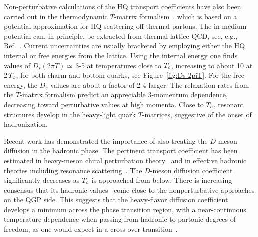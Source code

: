  Non-perturbative calculations of the HQ transport coefficients have also been carried out 
 in the thermodynamic $T$-matrix formalism~\cite{vanHees:2007me,Riek:2010fk,Huggins:2012dj}, 
 which is based on a potential approximation for HQ scattering off thermal partons. The 
 in-medium potential can, in principle, be extracted from thermal lattice QCD, see, e.g., 
 Ref.~\cite{Burnier:2014ssa}. Current uncertainties are usually bracketed by employing 
 either the HQ internal or free energies from the lattice. Using the internal energy one 
 finds values of $D_s(2\pi T)\simeq$\,3-5 at temperatures close to $T_{\rm c}$, increasing 
 to about 10 at 2\,$T_{\rm c}$, for both charm and bottom quarks, see Figure~\ref{fig:Ds-2piT}. 
 For the free energy, the $D_s$ values are about a factor of 2-4 larger. The relaxation 
 rates from the $T$-matrix formalism predict an appreciable 3-momentum dependence, decreasing 
 toward perturbative values at high momenta. Close to $T_{\rm c}$, resonant structures develop 
 in the heavy-light quark $T$-matrices, suggestive of the onset of hadronization. 
 
 Recent work has demonstrated the importance of also treating the  $D$ meson diffusion in the hadronic 
 phase. The pertinent transport coefficient has been estimated 
 in heavy-meson chiral perturbation theory~\cite{Laine:2011is} and in effective 
 hadronic theories including resonance 
 scattering~\cite{He:2011yi,Ghosh:2011bw,Abreu:2011ic,Tolos:2013kva}. The $D$-meson 
 diffusion coefficient significantly decreases as $T_{\rm c}$ is approached from below. 
 There is increasing consensus that its hadronic values~\cite{He:2011yi,Tolos:2013kva} 
 come close to the nonperturbative approaches on the QGP side. This suggests that the 
 heavy-flavor diffusion coefficient develops a minimum across the phase transition 
 region, with a near-continuous temperature dependence when passing from hadronic 
 to partonic degrees of freedom, as one would expect in a cross-over 
 transition~\cite{He:2011yi,He:2012df,Tolos:2013kva}. 
 

